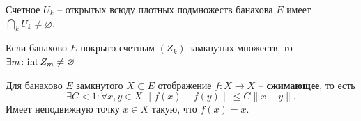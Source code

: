 
\begin{to_thr}
	Счетное ${U_k}$ -- открытых всюду плотных подмножеств банахова $E$ имеет $\bigcap_k U_k \neq \varnothing$.
\end{to_thr}

\begin{to_con}
	Если банахово $E$ покрыто счетным $(Z_k)$ замкнутых множеств, то $\exists m \colon \textnormal{int}\,Z_m \neq \varnothing$.
\end{to_con}

\begin{to_thr}
	Для банахово $E$ замкнутого $X \subset E$ отображение $f \colon X \to X$ -- \textbf{сжимающее}, то есть
	\begin{equation*}
	 	\exists C <1 \colon \forall x,y \in X \, \|f(x) - f(y)\| \leq C\|x-y\|.
	 \end{equation*} 
	 Имеет неподвижную точку $x \in X$ такую, что $f(x) = x$.
\end{to_thr}
